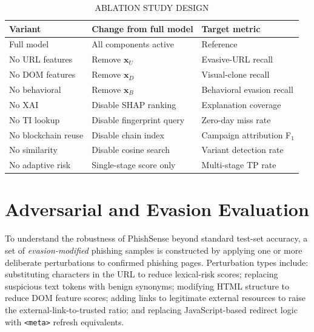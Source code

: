\documentclass[conference]{IEEEtran}
\begin{document}
\begin{table}[!t]
\caption{ABLATION STUDY DESIGN}
\label{tab:ablation}
\centering
\scriptsize
\setlength{\tabcolsep}{3pt}
\begin{tabularx}{\columnwidth}{|>{\raggedright\arraybackslash}p{}|>{\raggedright\arraybackslash}X|>{\raggedright\arraybackslash}p{}|}
\hline
\textbf{Variant} & \textbf{Change from full model} & \textbf{Target metric} \\ \hline
Full model         & All components active            & Reference \\ \hline
No URL features    & Remove $\mathbf{x}_U$           & Evasive-URL recall \\ \hline
No DOM features    & Remove $\mathbf{x}_D$           & Visual-clone recall \\ \hline
No behavioral      & Remove $\mathbf{x}_B$           & Behavioral evasion recall \\ \hline
No XAI             & Disable SHAP ranking             & Explanation coverage \\ \hline
No TI lookup       & Disable fingerprint query        & Zero-day miss rate \\ \hline
No blockchain reuse & Disable chain index             & Campaign attribution F$_1$ \\ \hline
No similarity      & Disable cosine search            & Variant detection rate \\ \hline
No adaptive risk   & Single-stage score only          & Multi-stage TP rate \\ \hline
\end{tabularx}
\end{table}

\section{Adversarial and Evasion Evaluation}

To understand the robustness of PhishSense beyond standard test-set accuracy, a set of
\textit{evasion-modified} phishing samples is constructed by applying one or more deliberate
perturbations to confirmed phishing pages.
Perturbation types include: substituting characters in the URL to reduce lexical-risk scores;
replacing suspicious text tokens with benign synonyms; modifying HTML structure to reduce DOM
feature scores; adding links to legitimate external resources to raise the external-link-to-trusted
ratio; and replacing JavaScript-based redirect logic with \texttt{<meta>} refresh equivalents.
\end{document}
